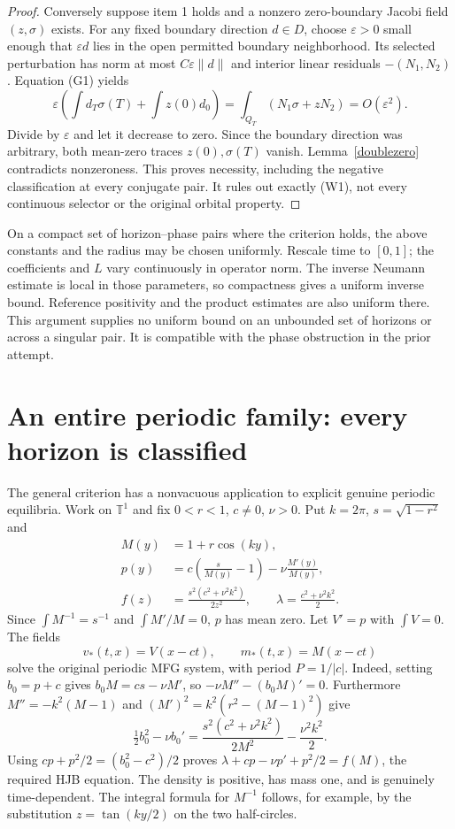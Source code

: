 \documentclass[11pt,a4paper]{article}
\begin{document}
\begin{proof}
Conversely suppose item 1 holds and a nonzero zero-boundary Jacobi
field $(z,\sigma)$ exists. For any fixed boundary direction
$d\in D$, choose $\varepsilon>0$ small enough that $\varepsilon d$
lies in the open permitted boundary neighborhood. Its selected
perturbation has norm at most $C\varepsilon\|d\|$ and interior
linear residuals $-(N_1,N_2)$. Equation (G1) yields
\[
 \varepsilon\left(\int d_T\sigma(T)+\int z(0)d_0\right)
   =\int_{Q_T}(N_1\sigma+zN_2)=O(\varepsilon^2).
\]
Divide by $\varepsilon$ and let it decrease to zero. Since the
boundary direction was arbitrary, both mean-zero traces
$z(0),\sigma(T)$ vanish. Lemma~\ref{doublezero} contradicts
nonzeroness. This proves necessity, including the negative
classification at every conjugate pair. It rules out exactly (W1),
not every continuous selector or the original orbital property.
\end{proof}

On a compact set of horizon--phase pairs where the criterion holds,
the above constants and the radius may be chosen uniformly. Rescale
time to $[0,1]$; the coefficients and $L$ vary continuously in operator
norm. The inverse Neumann estimate is local in those parameters, so
compactness gives a uniform inverse bound. Reference positivity and
the product estimates are also uniform there. This argument supplies
no uniform bound on an unbounded set of horizons or across a singular
pair. It is compatible with the phase obstruction in the prior attempt.

\section{An entire periodic family: every horizon is classified}
The general criterion has a nonvacuous application to explicit genuine
periodic equilibria. Work on $\mathbb T^1$ and fix
$0<r<1$, $c\ne0$, $\nu>0$. Put $k=2\pi$, $s=\sqrt{1-r^2}$ and
\begin{equation}\tag{TW1}\label{TW1}
 \begin{aligned}
 M(y)&=1+r\cos(ky),\\
 p(y)&=c\left(\frac{s}{M(y)}-1\right)-\nu\frac{M'(y)}{M(y)},\\
 f(z)&=\frac{s^2(c^2+\nu^2k^2)}{2z^2},\qquad
 \lambda=\frac{c^2+\nu^2k^2}{2}.
 \end{aligned}
\end{equation}
Since $\int M^{-1}=s^{-1}$ and $\int M'/M=0$, $p$ has mean zero.
Let $V'=p$ with $\int V=0$. The fields
\begin{equation}\tag{TW2}\label{TW2}
 v_*(t,x)=V(x-ct),\qquad m_*(t,x)=M(x-ct)
\end{equation}
solve the original periodic MFG system, with period $P=1/|c|$.
Indeed, setting $b_0=p+c$ gives
$b_0M=cs-\nu M'$, so $-\nu M''-(b_0M)'=0$.
Furthermore $M''=-k^2(M-1)$ and
$(M')^2=k^2(r^2-(M-1)^2)$ give
\[
 \tfrac12b_0^2-\nu b_0'
 =\frac{s^2(c^2+\nu^2k^2)}{2M^2}-\frac{\nu^2k^2}{2}.
\]
Using $cp+p^2/2=(b_0^2-c^2)/2$ proves
$\lambda+cp-\nu p'+p^2/2=f(M)$, the required HJB equation.
The density is positive, has mass one, and is genuinely time-dependent.
The integral formula for $M^{-1}$ follows, for example, by the
substitution $z=\tan(k y/2)$ on the two half-circles.
\end{document}
